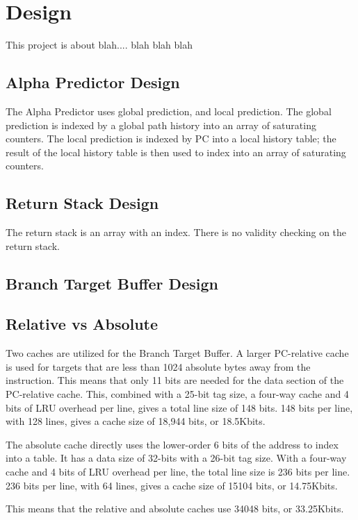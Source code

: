 \section{Design}
This project is about blah.... blah blah blah

\subsection{Alpha Predictor Design}
The Alpha Predictor uses global prediction, and local prediction. The global prediction is indexed by a global path history into an array of saturating counters. The local prediction is indexed by PC into a local history table; the result of the local history table is then used to index into an array of saturating counters.

\subsection{Return Stack Design}
The return stack is an array with an index. There is no validity checking on the return stack. 

\subsection{Branch Target Buffer Design}

\subsection{Relative vs Absolute}
Two caches are utilized for the Branch Target Buffer. A larger PC-relative cache is used for targets that are less than 1024 absolute bytes away from the instruction. This means that only 11 bits are needed for the data section of the PC-relative cache. This, combined with a 25-bit tag size, a four-way cache and 4 bits of LRU overhead per line, gives a total line size of 148 bits. 148 bits per line, with 128 lines, gives a cache size of 18,944 bits, or 18.5Kbits.

The absolute cache directly uses the lower-order 6 bits of the address to index into a table. It has a data size of 32-bits with a 26-bit tag size. With a four-way cache and 4 bits of LRU overhead per line, the total line size is 236 bits per line. 236 bits per line, with 64 lines, gives a cache size of 15104 bits, or 14.75Kbits.

This means that the relative and absolute caches use 34048 bits, or 33.25Kbits. 
